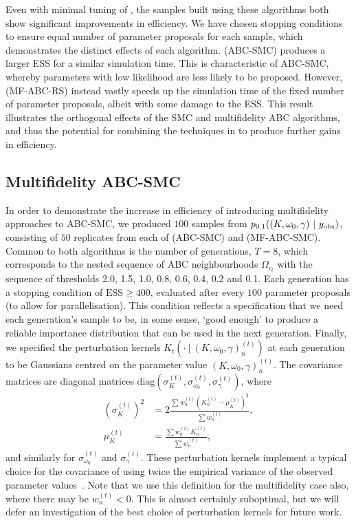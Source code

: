 \documentclass[review,demo]{siamonline190516}
\begin{document}
Even with minimal tuning of , the samples built using these algorithms both show significant improvements in efficiency.
We have chosen stopping conditions to ensure equal number of parameter proposals for each sample, which demonstrates the distinct effects of each algorithm.
 (ABC-SMC) produces a larger ESS for a similar simulation time.
This is characteristic of ABC-SMC, whereby parameters with low likelihood are less likely to be proposed.
However,  (MF-ABC-RS) instead vastly speeds up the simulation time of the fixed number of parameter proposals, albeit with some damage to the ESS.
This result illustrates the orthogonal effects of the SMC and multifidelity ABC algorithms, and thus the potential for combining the techniques in  to produce further gains in efficiency.

\subsection{Multifidelity ABC-SMC}
\label{s:Results}

In order to demonstrate the increase in efficiency of introducing multifidelity approaches to ABC-SMC, we produced $100$ samples from $p_{0.1}((K, \omega_0, \gamma)~|~y_{\mathrm{obs}})$, consisting of $50$ replicates from each of  (ABC-SMC) and  (MF-ABC-SMC).
Common to both algorithms is the number of generations, $T=8$, which corresponds to the nested sequence of ABC neighbourhoods $\Omega_{\epsilon_t}$ with the sequence of thresholds 2.0, 1.5, 1.0, 0.8, 0.6, 0.4, 0.2 and 0.1.
Each generation has a stopping condition of $\mathrm{ESS} \geq 400$, evaluated after every $100$ parameter proposals (to allow for parallelisation).
This condition reflects a specification that we need each generation's sample to be, in some sense, `good enough' to produce a reliable importance distribution that can be used in the next generation.
Finally, we specified the perturbation kernels $K_t(\cdot~|~(K, \omega_0, \gamma)^{(t)}_n)$ at each generation to be Gaussians centred on the parameter value $(K, \omega_0, \gamma)^{(t)}_n$.
The covariance matrices are diagonal matrices $\mathrm{diag}(\sigma_K^{(t)}, \sigma_{\omega_0}^{(t)}, \sigma_\gamma^{(t)})$, where 
\begin{align*}
(\sigma_K^{(t)})^2 &= 2 \frac{\sum w_n^{(t)} (K_n^{(t)} - \mu_K^{(t)})^2}{\sum w_n^{(t)}}, \\
\mu_K^{(t)} &= \frac{\sum w_n^{(t)} K_n^{(t)} }{\sum w_n^{(t)}},
\end{align*}
and similarly for $\sigma_{\omega_0}^{(t)}$ and $\sigma_\gamma^{(t)}$.
These perturbation kernels implement a typical choice for the covariance of using twice the empirical variance of the observed parameter values~\cite{Beaumont2009,Filippi2013}.
Note that we use this definition for the multifidelity case also, where there may be $w^{(t)}_n<0$.
This is almost certainly suboptimal, but we will defer an investigation of the best choice of perturbation kernels for future work.
\end{document}
